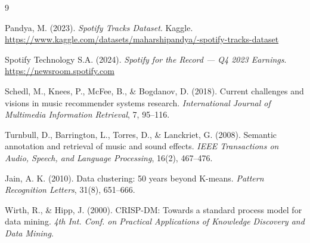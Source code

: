 \documentclass[12pt, a4paper]{article}
\begin{document}
\begin{thebibliography}{9}

Pandya, M. (2023). \textit{Spotify Tracks Dataset}. Kaggle.
\url{https://www.kaggle.com/datasets/maharshipandya/-spotify-tracks-dataset}

Spotify Technology S.A. (2024). \textit{Spotify for the Record — Q4 2023 Earnings}.
\url{https://newsroom.spotify.com}

Schedl, M., Knees, P., McFee, B., \& Bogdanov, D. (2018). Current
challenges and visions in music recommender systems research.
\textit{International Journal of Multimedia Information Retrieval}, 7, 95--116.

Turnbull, D., Barrington, L., Torres, D., \& Lanckriet, G. (2008).
Semantic annotation and retrieval of music and sound effects.
\textit{IEEE Transactions on Audio, Speech, and Language Processing},
16(2), 467--476.

Jain, A. K. (2010). Data clustering: 50 years beyond K-means.
\textit{Pattern Recognition Letters}, 31(8), 651--666.

Wirth, R., \& Hipp, J. (2000). CRISP-DM: Towards a standard process model
for data mining. \textit{4th Int. Conf. on Practical Applications of
Knowledge Discovery and Data Mining}.

\end{thebibliography}
\end{document}
